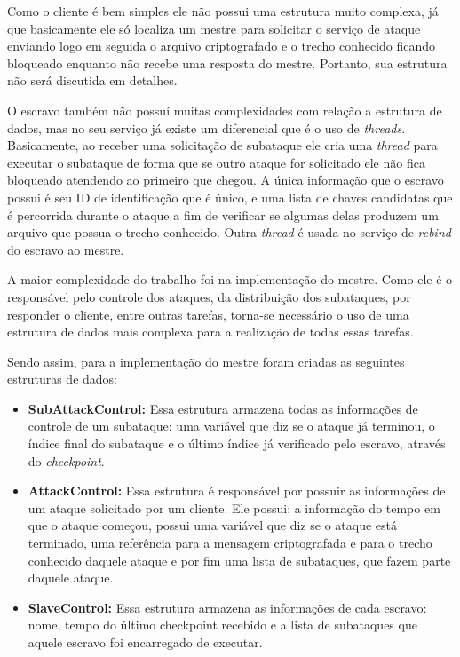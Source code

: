 \documentclass[
	12pt,				%
    oneside,			%
	a4paper,			%
	english,			%
	brazil,				%
	]{abntex2}
\begin{document}
Como o cliente é bem simples ele não possui uma estrutura muito complexa, já que basicamente ele só localiza um mestre para solicitar o serviço de ataque enviando logo em seguida o arquivo criptografado e o trecho conhecido ficando bloqueado enquanto não recebe uma resposta do mestre. Portanto, sua estrutura não será discutida em detalhes.

O escravo também não possuí muitas complexidades com relação a estrutura de dados, mas no seu serviço já existe um 
diferencial que é o uso de \textit{threads}. Basicamente, ao receber uma solicitação de subataque ele cria uma \textit{thread} para executar o subataque de forma que se outro ataque for solicitado ele não fica bloqueado atendendo ao primeiro que chegou.
A única informação que o escravo possui é seu ID de identificação que é único, e uma lista de chaves candidatas que é percorrida durante o ataque a fim de verificar se algumas delas produzem um arquivo que possua o trecho conhecido.
Outra \textit{thread} é usada no serviço de \textit{rebind} do escravo ao mestre.

A maior complexidade do trabalho foi na implementação do mestre. Como ele é o responsável pelo controle dos ataques, 
da distribuição dos subataques, por responder o cliente, entre outras tarefas, torna-se necessário o uso de uma estrutura 
de dados mais complexa para a realização de todas essas tarefas.

Sendo assim, para a implementação do mestre foram criadas as seguintes estruturas de dados:

\begin{itemize}

	\item \textbf{SubAttackControl:} Essa estrutura armazena todas as informações de controle de um subataque: uma variável 
	que diz se o ataque já terminou, o índice final do subataque e o último índice já verificado pelo escravo, através do
	\textit{checkpoint}.
	
	\item \textbf{AttackControl:} Essa estrutura é responsável por possuir as informações de um ataque solicitado por um
	cliente. Ele possui: a informação do tempo em que o ataque começou, possui uma variável que diz se o ataque está 
	terminado, uma referência para a mensagem criptografada e para o trecho conhecido daquele ataque e por fim uma lista 
	de subataques, que fazem parte daquele ataque.
	
	\item \textbf{SlaveControl:} Essa estrutura armazena as informações de cada escravo: nome, tempo do último checkpoint
	recebido e a lista de subataques que aquele escravo foi encarregado de executar.
	
\end{itemize}
\end{document}
